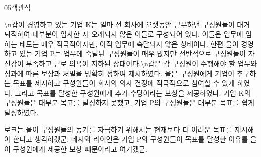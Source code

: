 \documentclass[fs85,seriesWit]{korfarm-base}
\begin{document}
\begin{kfQBlock}{05}{객관식}
\begin{kfEvidence}\textbackslash{}n갑이 경영하고 있는 기업 K는 얼마 전 회사에 오랫동안 근무하던 구성원들이 대거 퇴직하여 대부분이 입사한 지 오래되지 않은 이들로 구성되어 있다. 이들은 업무에 임하는 태도는 매우 적극적이지만, 아직 업무에 숙달되지 않은 상태이다. 한편 을이 경영하고 있는 기업 P는 업무에 숙달된 구성원들이 매우 많지만 전반적으로 구성원들이 자신감이 부족하고 근로 의욕이 저하된 상태이다.\textbackslash{}n갑은 각 구성원이 수행해야 할 업무와 성과에 따른 보상과 처벌을 명확히 정하여 제시하였다. 을은 구성원에게 기업이 추구하는 목표를 제시하고 구성원들이 회사의 의사 결정에 적극적으로 참여할 수 있게 하였다. 그리고 목표를 달성한 구성원에게 추가 수당이라는 보상을 제공하였다. 기업 K의 구성원들은 대부분 목표를 달성하지 못했고, 기업 P의 구성원들은 대부분 목표를 쉽게 달성하였다.\end{kfEvidence}
\begin{kfChoices}
\kfChoice 로크는 을이 구성원들의 동기를 자극하기 위해서는 현재보다 더 어려운 목표를 제시해야 한다고 생각하겠군.
\kfChoice 데시와 라이언은 기업 P의 구성원들이 목표를 달성한 이유를 을이 구성원에게 제공한 보상 때문이라고 여기겠군.
\end{kfChoices}
\end{kfQBlock}
\end{document}
